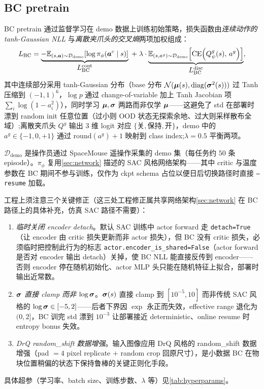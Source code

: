 \subsection{BC pretrain}\label{subsec:bc_pretrain}

BC pretrain 通过监督学习在 demo 数据上训练初始策略，损失函数由\emph{连续动作的 tanh-Gaussian NLL} 与\emph{离散夹爪头的交叉熵}两项加权组成：
\begin{equation*}
  L_\text{BC} = \underbrace{-\mathbb{E}_{(s, \bm{a})\sim\mathcal{D}_\text{demo}}\!\left[\log \pi_\phi(\bm{a}^c\mid s)\right]}_{\textstyle L_\text{BC}^\text{cont}}
  \;+\; \lambda \cdot
  \underbrace{\mathbb{E}_{(s, a^g)\sim\mathcal{D}_\text{demo}}\!\left[\mathrm{CE}\!\left(Q^g_\psi(s),\, a^g\right)\right]}_{\textstyle L_\text{BC}^\text{disc}},
\end{equation*}
其中连续部分采用 tanh-Gaussian 分布（base 分布 $\mathcal{N}(\bm{\mu}(s), \mathrm{diag}(\bm{\sigma}^2(s)))$ 过 Tanh 压缩到 $(-1, 1)^6$，$\log p$ 通过 change-of-variable 加上 Tanh Jacobian 项 $\sum_i \log(1 - a_i^2)$），同时学习 $\bm{\mu}, \bm{\sigma}$ 两路而非仅学 $\bm{\mu}$——这避免了 std 在部署时漂到 random init 任意位置（过小则 OOD 状态无探索余地、过大则采样散布全域）;离散夹爪头 $Q^g$ 输出 $3$ 维 logit 对应 $\{\text{关}, \text{保持}, \text{开}\}$，demo 中的 $a^g \in \{-1, 0, +1\}$ 通过 $\mathrm{round}(a^g)+1$ 映射到 class index;$\lambda = 0.5$ 平衡两项。

$\mathcal{D}_\text{demo}$ 是操作员通过 SpaceMouse 遥操作采集的 demo 集（每任务约 $50$ 条 episode）。$\pi_\phi$ 复用\cref{sec:network} 描述的 SAC 风格网络架构——其中 critic 与温度参数在 BC 期间不参与训练，仅作为 ckpt schema 占位以便日后切换路径时直接 \texttt{--resume} 加载。

工程上须注意三个关键修正（这三处工程修正属共享网络架构\cref{sec:network} 在 BC 路径上的具体补充，仿真 SAC 路径不需要）：
\begin{enumerate}
  \item \emph{临时关闭 encoder detach}。默认 SAC 训练中 actor forward 走 \texttt{detach=True}（让 encoder 由 critic 损失更新而非 actor 损失），但 BC 没有 critic 损失，必须临时把控制此行为的标志 \texttt{actor.encoder\_is\_shared=False}（actor forward 是否对 encoder 输出 detach）关掉，使 BC NLL 能直接反传到 encoder——否则 encoder 停在随机初始化、actor MLP 头只能在随机特征上拟合，部署时输出近常数。
  \item \emph{$\bm{\sigma}$ 直接 clamp 而非 $\log\bm{\sigma}$}。$\bm{\sigma}(s)$ 直接 clamp 到 $[10^{-5}, 10]$ 而非传统 SAC 风格的 $\log\bm{\sigma} \in [-5, 2]$——后者下界因 $\exp$ 永正而失效，effective range 退化为 $(0, 2]$，BC 训完 std 漂到 $10^{-3}$ 让部署接近 deterministic、online resume 时 entropy bonus 失效。
  \item \emph{DrQ random\_shift 数据增强}。输入图像应用 DrQ 风格的 random\_shift 数据增强（pad $= 4$ pixel replicate $+$ random crop 回原尺寸），是小数据 BC 在物块位置稍偏的状态下保持鲁棒的关键正则化手段。
\end{enumerate}
具体超参（学习率、batch size、训练步数、$\lambda$ 等）见\cref{tab:hyperparams}。

